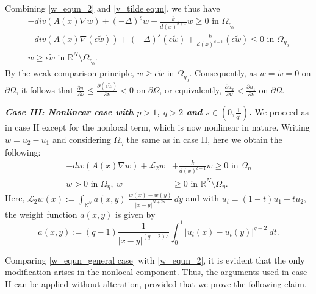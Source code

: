 \documentclass[reqno,oneside]{amsart}
\theoremstyle{definition}
\theoremstyle{remark}
\numberwithin{equation}{section}
\newcommand{\Om} {\Omega}
\newcommand{\sr}{\mathbb{R}}
\newcommand{\s}{(-\Delta)^s}
\newcommand{\pa}{\partial}
\newcommand{\na} {\nabla}
\begin{document}
Combining \eqref{w_equn_2} and \eqref{v_tilde equn}, we thus have
\begin{equation}\label{comparison q=2 case}
    \begin{aligned}
        -div \left(A(x)\na w \right) + \s w + \frac{k}{d(x)^{\delta +1}} w \geq 0 \text{ in } \Om_{\eta_0}\\
        -div \left(A(x)\na \left(\epsilon \tilde{w} \right) \right) + \s \left(\epsilon \tilde{w} \right) + \frac{k}{d(x)^{\delta +1}} \left(\epsilon \tilde{w}\right) \leq 0 \text{ in } \Om_{\eta_0}\\
        w \geq \epsilon \tilde{w} \text{ in } \sr^N \setminus \Om_{\eta_0}.
    \end{aligned}
\end{equation}
By the weak comparison principle, $w \geq \epsilon \tilde{w}$ in $\Om_{\eta_0}$. Consequently, as $w= \tilde{w} =0$ on $\pa\Om$, it follows that $\frac{\pa w}{\pa \nu} \leq \frac{\pa \left(\epsilon \tilde{w} \right)}{\pa \nu} < 0$ on $\pa\Om$, or equivalently, $\frac{\pa u_2}{\pa \nu} < \frac{\pa u_1}{\pa \nu}$ on $\pa\Om$.
\vspace{5pt}

\noindent\textit{\textbf{Case III: Nonlinear case with $p>1$, $q>2$ and $s\in \left( 0, \frac{1}{q'} \right)$.}} We proceed as in case II except for the nonlocal term, which is now nonlinear in nature. Writing $w=u_2-u_1$ and considering $\Om_{\eta}$ the same as in case II, here we obtain the following:
\begin{equation}\label{w_equn_general case}
    \begin{aligned}
        -div \left(A(x)\na w \right) + \mathcal{L}_2 w &+ \frac{k}{d(x)^{\delta +1}} w \geq 0 \text{ in } \Om_{\eta}\\
        w >0 \text{ in } \Om_{\eta},\ w &\geq 0 \text{ in } \sr^N \setminus \Om_{\eta}.
    \end{aligned}
\end{equation}
Here, $\displaystyle{\mathcal{L}_2 w (x):= \int_{\sr^N} a(x,y)\ \frac{w(x) - w(y)}{|x-y|^{N+2s}}\ dy}$ and with $u_t = (1-t) u_1 + t u_2$, the weight function $a(x,y)$ is given by
\[a(x,y):= (q-1) \frac{1}{|x-y|^{(q-2)s}} \int_0^1 |u_t (x) - u_t (y)|^{q-2}\ dt.\]

Comparing \eqref{w_equn_general case} with \eqref{w_equn_2}, it is evident that the only modification arises in the nonlocal component. Thus, the arguments used in case II can be applied without alteration, provided that we prove the following claim.
\vspace{5pt}
\end{document}
